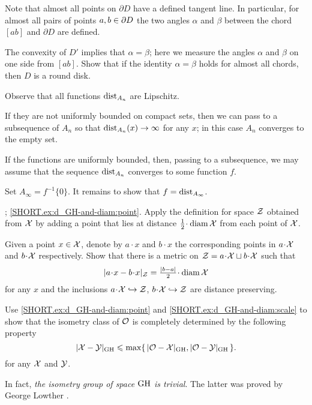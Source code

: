 Note that almost all points on $\partial D$ have a defined tangent line.
In particular, for almost all pairs of points $a,b\z\in\partial D$ the two angles $\alpha$ and $\beta$ between the chord $[ab]$ and $ \partial D$ are defined.

The convexity of $D'$ implies that $\alpha=\beta$;
here we measure the angles $\alpha$ and $\beta$ on one side from $[ab]$.
Show that if the identity $\alpha=\beta$ holds for almost all chords, then $D$ is a round disk. 


Observe that all functions $\mathrm{dist}_{A_n}$ are Lipschitz.

If they are not uniformly bounded on compact sets, then we can pass to a subsequence of $A_n$ so that $\mathrm{dist}_{A_n}(x)\to\infty$ for any $x$;
in this case $A_n$ converges to the empty set.

If the functions are uniformly bounded, then, passing to a subsequence, we may assume that the sequence $\mathrm{dist}_{A_n}$ converges to some function $f$.

Set $A_\infty=f^{-1}\{0\}$.
It remains to show that $f=\mathrm{dist}_{A_\infty}$.


\parbf{\ref{ex:d_GH-and-diam}};
\ref{SHORT.ex:d_GH-and-diam:point}.
Apply the definition for space $\mathcal{Z}$ obtained from $\mathcal{X}$ by adding a point that lies at distance $\tfrac12\cdot\diam \spc{X}$ from each point of $\mathcal{X}$.

Given a point $x\in\mathcal{X}$, denote by $a\cdot x$ and $b\cdot x$ the corresponding points in $a\cdot\spc{X}$ and $b\cdot \spc{X}$ respectively.
Show that there is a metric on $\spc{Z}\z=a\cdot\spc{X}\sqcup b\cdot\spc{X}$ such that 
\[|a\cdot x-b\cdot x|_{\spc{Z}}=\tfrac{|b-a|}2\cdot\diam\spc{X}\]
for any $x$ and the inclusions
$a\cdot\spc{X}\hookrightarrow\spc{Z}$,
$b\cdot\spc{X}\hookrightarrow\spc{Z}$ are distance preserving.

Use \ref{SHORT.ex:d_GH-and-diam:point} and \ref{SHORT.ex:d_GH-and-diam:scale} to show that the isometry class of $\mathcal{O}$ is completely determined by the following property
\[|\mathcal{X}-\mathcal{Y}|_{\operatorname{\rm GH}\nolimits} \leqslant \max\{\,|\mathcal{O}-\mathcal{X}|_{\operatorname{\rm GH}\nolimits},|\mathcal{O}-\mathcal{Y}|_{\operatorname{\rm GH}\nolimits}\,\}.\]
for any $\mathcal{X}$ and $\mathcal{Y}$.

In fact, \textit{the isometry group of space $\operatorname{\rm GH}\nolimits$ is trivial}.
The latter was proved by George Lowther \cite{lowther, ivanov-tuzhilin}.

